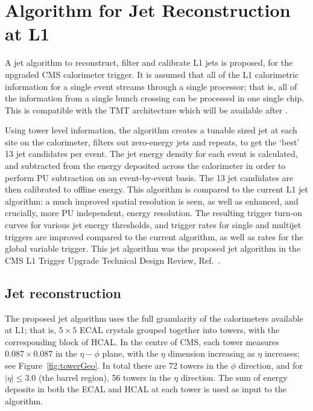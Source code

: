 \section{Algorithm for Jet Reconstruction at L1}
\label{Sec:Algo}
A jet algorithm to reconstruct, filter and calibrate \ac{L1} jets is proposed, for the upgraded \ac{CMS} calorimeter trigger.
It is assumed that all of the \ac{L1} calorimetric information for a single event streams through a single processor; that is, all of the information from a single bunch crossing can be processed in one single chip.
This is compatible with the \ac{TMT} architecture which will be available after . 

Using tower level information, the algorithm creates a tunable sized jet at each site on the calorimeter, filters out zero-energy jets and repeats, to get the `best' 13 jet candidates per event. 
The  jet energy density for each event is calculated, and subtracted from the energy deposited across the calorimeter in order to perform \ac{PU} subtraction on an event-by-event basis. 
The 13 jet candidates are then calibrated to offline energy. 
This algorithm is compared to the current \ac{L1} jet algorithm: a much improved spatial resolution is seen, as well as enhanced, and crucially, more \ac{PU} independent, energy resolution. 
The resulting trigger turn-on curves for various jet energy thresholds, and trigger rates for single and multijet triggers are improved compared to the current algorithm, as well as rates for the global variable \HT trigger.
This jet algorithm was the proposed jet algorithm in the \ac{CMS} \ac{L1} Trigger Upgrade Technical Design Review, Ref.~\cite{Tapper:1556311}. 


\subsection{Jet reconstruction}

The proposed jet algorithm uses the full granularity of the calorimeters available at \ac{L1}; that is, $5 \times 5$ \ac{ECAL} crystals grouped together into towers, with the corresponding block of \ac{HCAL}. 
In the centre of \ac{CMS}, each tower measures $0.087\times0.087$ in the $\eta-\phi$ plane, with the $\eta$ dimension increasing as $\eta$ increases; see Figure~\ref{fig:towerGeo}. 
In total there are 72 towers in the $\phi$ direction, and for $|\eta|\leq3.0$ (the barrel region), 56 towers in the $\eta$ direction.
The sum of energy deposits in both the \ac{ECAL} and \ac{HCAL} at each tower is used as input to the algorithm. 

